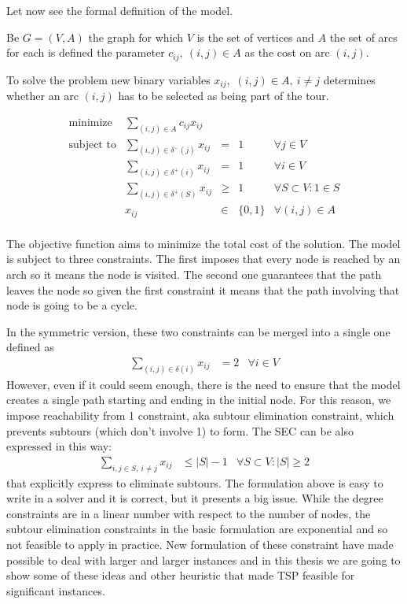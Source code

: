 Let now see the formal definition of the model. 

Be $G = (V, A)$ the graph for which $V$ is the set of vertices and $A$ the set
of arcs for each is defined the parameter $c_{ij},\ (i,j) \in A$ as the cost on
arc $(i,j)$.

To solve the problem new binary variables $x_{ij}$,\ $(i,j) \in A,\ i \neq j$
determines whether an arc $(i,j)$ has to be selected as being part of the tour.

\begin{equation*}
    \begin{array}{lrllr}
        \textrm{minimize}   & \displaystyle\sum_{(i, j) \in A} c_{ij}  x_{ij} \\
        \textrm{subject to} & \displaystyle\sum\limits_{(i, j) \in \delta^-(j)}  x_{ij} & = & 1 & \forall j \in V\\
                            & \displaystyle\sum\limits_{(i, j) \in \delta^+(i)}  x_{ij} & = & 1 & \forall i \in V\\
                            & \displaystyle\sum\limits_{(i, j) \in \delta^+(S)}  x_{ij} & \ge & 1 & \forall S \subset V : 1 \in S\\
                            & x_{ij} & \in & \{0,1\} & \forall (i,j) \in A \\
    \end{array}
\end{equation*}


The objective function aims to minimize the total cost of the solution. The
model is subject to three constraints. The first imposes that every node is
reached by an arch so it means the node is visited. The second one guarantees
that the path leaves the node so given the first constraint it means that the
path involving that node is going to be a cycle.

In the symmetric version, these two constraints can be merged into a single one
defined as
\begin{align*} 
    \sum_{(i,j) \in \delta(i)} x_{ij} & = 2 & \forall i\in V
\end{align*} 
However, even if it could seem enough, there is the need to ensure that the
model creates a single path starting and ending in the initial node. For this
reason, we impose reachability from 1 constraint, aka subtour elimination
constraint, which prevents subtours (which don't involve 1) to form. The SEC
can be also expressed in this way:
\begin{align*} 
    \sum_{i,j \in S,\ i \neq j} x_{ij} & \le |S|-1 & \forall S \subset V: |S| \ge 2
\end{align*}
that explicitly express to eliminate subtours.
The formulation above is easy to write in a solver and it is correct, but it
presents a big issue. While the degree constraints are in a linear number with
respect to the number of nodes, the subtour elimination constraints in the
basic formulation are exponential and so not feasible to apply in practice. New
formulation of these constraint have made possible to deal with larger and
larger instances and in this thesis we are going to show some of these ideas
and other heuristic that made TSP feasible for significant instances.
